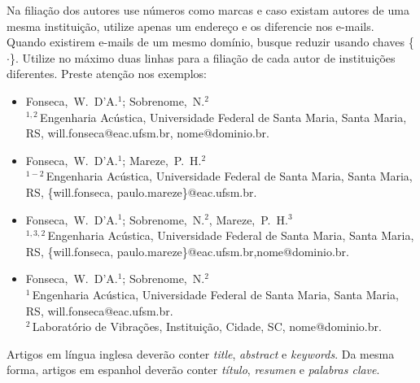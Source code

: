 Na filiação dos autores use números como marcas e caso existam autores de uma mesma instituição, utilize apenas um endereço e os diferencie nos e-mails. Quando existirem e-mails de um mesmo domínio, busque reduzir usando chaves \{$\cdot$\}. Utilize no máximo duas linhas para a filiação de cada autor de instituições diferentes. Preste atenção nos exemplos:

\begin{flushleft}
\begin{itemize}[noitemsep,topsep=-1ex,align=left,leftmargin=0.2cm] \itemsep=10pt

	\item Fonseca,~W.~D'A.$^1$; Sobrenome,~N.$^2$\\[5pt]	
{\small		$^{1,2}$\,Engenharia Acústica, Universidade Federal de Santa Maria, Santa Maria, RS,\linebreak 
	 will.fonseca@eac.ufsm.br, nome@dominio.br.}
	
	\vspace{2mm}
	\item Fonseca,~W.~D'A.$^1$; Mareze,~P.~H.$^2$\\[5pt]	
{\small	$^{1-2}$\,Engenharia Acústica, Universidade Federal de Santa Maria, Santa Maria, RS, 
	\{will.fonseca, paulo.mareze\}@eac.ufsm.br.}
	
	\newpage
	
	\item Fonseca,~W.~D'A.$^1$; Sobrenome,~N.$^2$, Mareze,~P.~H.$^3$\\[6pt]	
{\small		$^{1,3,2}$\,Engenharia Acústica, Universidade Federal de Santa Maria, Santa Maria, RS, 
	\{will.fonseca, paulo.mareze\}@eac.ufsm.br,\linebreak nome@dominio.br.}

	\item Fonseca,~W.~D'A.$^1$; Sobrenome,~N.$^2$\\[5pt]	
{\small		$^{1}$\,Engenharia Acústica, Universidade Federal de Santa Maria, Santa Maria, RS, 
	will.fonseca@eac.ufsm.br.\\[4pt]		
	$^2$\,Laboratório de Vibrações, Instituição, Cidade, SC, nome@dominio.br.}
\end{itemize}
\end{flushleft}

\vspace{-0.6\baselineskip}

Artigos em língua inglesa deverão conter \textit{title}, \textsl{abstract} e \textit{keywords}. Da mesma forma, artigos em espanhol deverão conter \textit{título}, \textit{resumen} e \textit{palabras clave}.

